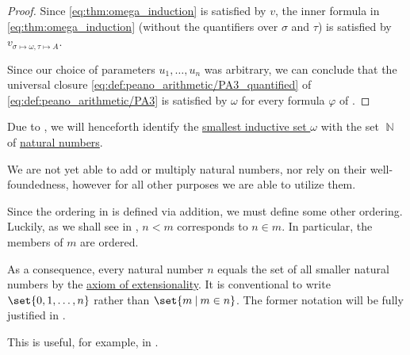\begin{proof}
  Since \eqref{eq:thm:omega_induction} is satisfied by \( v \), the inner formula in \eqref{eq:thm:omega_induction} (without the quantifiers over \( \sigma \) and \( \tau \)) is satisfied by \( v_{\sigma \mapsto \omega, \tau \mapsto A} \).

  Since our choice of parameters \( u_1, \ldots, u_n \) was arbitrary, we can conclude that the universal closure \eqref{eq:def:peano_arithmetic/PA3_quantified} of \eqref{eq:def:peano_arithmetic/PA3} is satisfied by \( \omega \) for every formula \( \varphi \) of .
\end{proof}

\begin{remark}\label{rem:set_theory_natural_numbers_without_operations}
  Due to , we will henceforth identify the \hyperref[thm:smallest_inductive_set_existence]{smallest inductive set \( \omega \)} with the set \( \BbbN \) of \hyperref[def:set_of_natural_numbers]{natural numbers}.

  We are not yet able to add or multiply natural numbers, nor rely on their well-foundedness, however for all other purposes we are able to utilize them.

  Since the ordering in  is defined via addition, we must define some other ordering. Luckily, as we shall see in , \( n < m \) corresponds to \( n \in m \). In particular, the members of \( m \) are ordered.

  As a consequence, every natural number \( n \) equals the set of all smaller natural numbers by the \hyperref[def:naive_set_theory/extensionality]{axiom of extensionality}. It is conventional to write \( \set{ 0, 1, \ldots, n } \) rather than \( \set{ m \given m \in n } \). The former notation will be fully justified in .

  This is useful, for example, in .
\end{remark}
